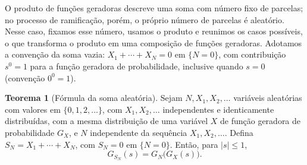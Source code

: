 \documentclass[12pt,portuguese]{article}
\theoremstyle{definition}
\newtheorem{theorem}{Teorema}
\theoremstyle{plainexercise}
\theoremstyle{starredexercise}
\theoremstyle{definition}
\begin{document}
\medskip

O produto de funções geradoras descreve uma soma com número fixo de parcelas;
no processo de ramificação, porém, o próprio número de parcelas é aleatório.
Nesse caso, fixamos esse número, usamos o produto e reunimos os casos possíveis,
o que transforma o produto em uma composição de funções geradoras. Adotamos a
convenção da soma vazia: $X_1+\cdots+X_N=0$ em $\{N=0\}$, com contribuição
$s^0=1$ para a função geradora de probabilidade, inclusive quando $s=0$
(convenção $0^0=1$).

\begin{theorem}[Fórmula da soma aleatória]\label{thm:soma-aleatoria}
Sejam $N,X_1,X_2,\ldots$ variáveis aleatórias com valores em
$\{0,1,2,\ldots\}$, com $X_1,X_2,\ldots$ independentes e identicamente
distribuídas, com a mesma distribuição de uma variável $X$ de função geradora
de probabilidade $G_X$, e $N$ independente da sequência $X_1,X_2,\ldots$. Defina
$S_N=X_1+\cdots+X_N$, com
$S_N=0$ em $\{N=0\}$. Então, para $|s|\leqslant 1$,
\begin{equation}\label{eq:fgp-soma-aleatoria}
G_{S_N}(s)=G_N\bigl(G_X(s)\bigr).
\end{equation}
\end{theorem}
\end{document}
